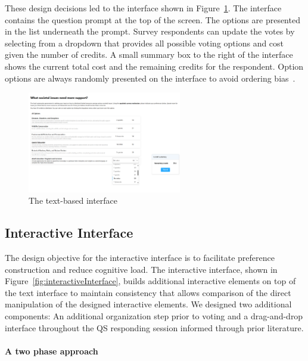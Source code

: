 These design decisions led to the interface shown in Figure~\ref{fig:textInterface}. The interface contains the question prompt at the top of the screen. The options are presented in the list underneath the prompt. Survey respondents can update the votes by selecting from a dropdown that provides all possible voting options and cost given the number of credits. A small summary box to the right of the interface shows the current total cost and the remaining credits for the respondent. Option options are always randomly presented on the interface to avoid ordering bias~\cite{ferberOrderBiasMail1952, couperWebSurveyDesign2001}.

\begin{figure}[H]
    \centering
    \includegraphics[width=0.6\textwidth]{content/image/text_interface.png}
    \caption{The text-based interface}
    \label{fig:textInterface}
\end{figure}

\subsection{Interactive Interface}
The design objective for the interactive interface is to facilitate preference construction and reduce cognitive load. The interactive interface, shown in Figure~\ref{fig:interactiveInterface}, builds additional interactive elements on top of the text interface to maintain consistency that allows comparison of the direct manipulation of the designed interactive elements. We designed two additional components: An additional organization step prior to voting and a drag-and-drop interface throughout the QS responding session informed through prior literature.

\paragraph{A two phase approach}

